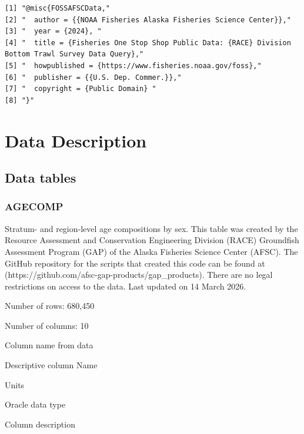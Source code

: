 \documentclass[
  letterpaper,
  oneside,
  open=any]{scrbook}
\begin{document}
\begin{verbatim}
[1] "@misc{FOSSAFSCData,"                                                                             
[2] "  author = {{NOAA Fisheries Alaska Fisheries Science Center}},"                                  
[3] "  year = {2024}, "                                                                               
[4] "  title = {Fisheries One Stop Shop Public Data: {RACE} Division Bottom Trawl Survey Data Query},"
[5] "  howpublished = {https://www.fisheries.noaa.gov/foss},"                                         
[6] "  publisher = {{U.S. Dep. Commer.}},"                                                            
[7] "  copyright = {Public Domain} "                                                                  
[8] "}"                                                                                               
\end{verbatim}

\chapter{Data Description}\label{data-description-1}

\section{Data tables}\label{data-tables}

\subsection{AGECOMP}\label{agecomp}

Stratum- and region-level age compositions by sex. This table was
created by the Resource Assessment and Conservation Engineering Division
(RACE) Groundfish Assessment Program (GAP) of the Alaska Fisheries
Science Center (AFSC). The GitHub repository for the scripts that
created this code can be found at
(https://github.com/afsc-gap-products/gap\_products). There are no legal
restrictions on access to the data. Last updated on 14 March 2026.

Number of rows: 680,450

Number of columns: 10

Column name from data

Descriptive column Name

Units

Oracle data type

Column description
\end{document}
